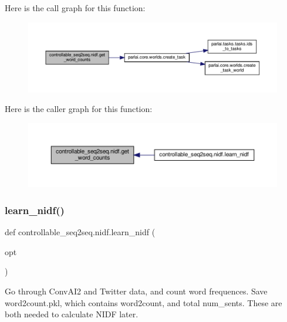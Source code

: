 Here is the call graph for this function\+:
\nopagebreak
\begin{figure}[H]
\begin{center}
\leavevmode
\includegraphics[width=350pt]{namespacecontrollable__seq2seq_1_1nidf_a37a19098963f0cd702448fb479fbe37d_cgraph}
\end{center}
\end{figure}
Here is the caller graph for this function\+:
\nopagebreak
\begin{figure}[H]
\begin{center}
\leavevmode
\includegraphics[width=350pt]{namespacecontrollable__seq2seq_1_1nidf_a37a19098963f0cd702448fb479fbe37d_icgraph}
\end{center}
\end{figure}
\mbox{\label{namespacecontrollable__seq2seq_1_1nidf_af8dba0db3cab81647b00a17f0a153ad3}} 
\subsubsection{\texorpdfstring{learn\+\_\+nidf()}{learn\_nidf()}}
{\footnotesize\ttfamily def controllable\+\_\+seq2seq.\+nidf.\+learn\+\_\+nidf (\begin{DoxyParamCaption}\item[{}]{opt }\end{DoxyParamCaption})}

\begin{DoxyVerb}Go through ConvAI2 and Twitter data, and count word frequences.
Save word2count.pkl, which contains word2count, and total num_sents.
These are both needed to calculate NIDF later.
\end{DoxyVerb}
 

